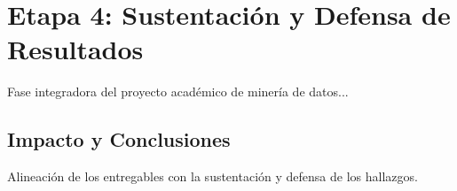 \section{Etapa 4: Sustentación y Defensa de Resultados}
\label{sec:u4_sustentacion_resultados}
Fase integradora del proyecto académico de minería de datos...

\subsection{Impacto y Conclusiones}
Alineación de los entregables con la sustentación y defensa de los hallazgos.
